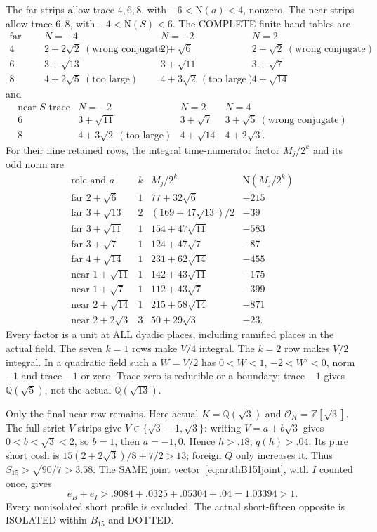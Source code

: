 \documentclass[11pt]{article}
\begin{document}
The far strips allow trace \(4,6,8\), with
\(-6<\mathrm N(a)<4\), nonzero.
The near strips allow trace \(6,8\), with
\(-4<\mathrm N(S)<6\).
The COMPLETE finite hand tables are
\[
\begin{array}{c|ccc}
 \text{far trace}&N=-4&N=-2&N=2\\ \hline
4&2+2\sqrt2\ (\text{wrong conjugate})&2+\sqrt6&
        2+\sqrt2\ (\text{wrong conjugate})\\
6&3+\sqrt{13}&3+\sqrt{11}&3+\sqrt7\\
8&4+2\sqrt5\ (\text{too large})&
        4+3\sqrt2\ (\text{too large})&4+\sqrt{14}
\end{array}
\]
and
\[
\begin{array}{c|ccc}
 \text{near }S\text{ trace}&N=-2&N=2&N=4\\ \hline
6&3+\sqrt{11}&3+\sqrt7&3+\sqrt5\ (\text{wrong conjugate})\\
8&4+3\sqrt2\ (\text{too large})&4+\sqrt{14}&4+2\sqrt3 .
\end{array}
\]
For their nine retained rows, the integral time-numerator
factor \(M_j/2^k\) and its odd norm are
\[
\begin{array}{c|c|c|r}
 \text{role and }a&k&M_j/2^k&\mathrm N(M_j/2^k)\\ \hline
 \text{far }2+\sqrt6&1&77+32\sqrt6&-215\\
 \text{far }3+\sqrt{13}&2&(169+47\sqrt{13})/2&-39\\
 \text{far }3+\sqrt{11}&1&154+47\sqrt{11}&-583\\
 \text{far }3+\sqrt7&1&124+47\sqrt7&-87\\
 \text{far }4+\sqrt{14}&1&231+62\sqrt{14}&-455\\
 \text{near }1+\sqrt{11}&1&142+43\sqrt{11}&-175\\
 \text{near }1+\sqrt7&1&112+43\sqrt7&-399\\
 \text{near }2+\sqrt{14}&1&215+58\sqrt{14}&-871\\
 \text{near }2+2\sqrt3&3&50+29\sqrt3&-23 .
\end{array}
\]
Every factor is a unit at ALL dyadic places,
including ramified places in the actual field.
The seven \(k=1\) rows make \(V/4\) integral.
The \(k=2\) row makes \(V/2\) integral.
In a quadratic field such a \(W=V/2\) has
\(0<W<1\), \(-2<W'<0\), norm \(-1\)
and trace \(-1\) or zero.
Trace zero is reducible or a boundary;
trace \(-1\) gives \(\mathbb Q(\sqrt5)\),
not the actual \(\mathbb Q(\sqrt{13})\).

Only the final near row remains.
Here actual \(K=\mathbb Q(\sqrt3)\) and
\(\mathcal O_K=\mathbb Z[\sqrt3]\).
The full strict \(V\) strips give
\(V\in\{\sqrt3-1,\sqrt3\}\):
writing \(V=a+b\sqrt3\) gives \(0<b<\sqrt3<2\),
so \(b=1\), then \(a=-1,0\).
Hence \(h>.18\), \(q(h)>.04\).
Its pure short cosh is
\(15(2+2\sqrt3)/8+7/2>13\);
foreign \(Q\) only increases it.
Thus \(S_{15}>\sqrt{90/7}>3.58\).
The SAME joint vector~\eqref{eq:arithB15Ijoint},
with \(I\) counted once, gives
\[
                   e_B+e_I>.9084+.0325+.05304+.04
                                =1.03394>1.
\]
Every nonisolated short profile is excluded.
The actual short-fifteen opposite is ISOLATED
within \(B_{15}\) and DOTTED.
\end{document}
